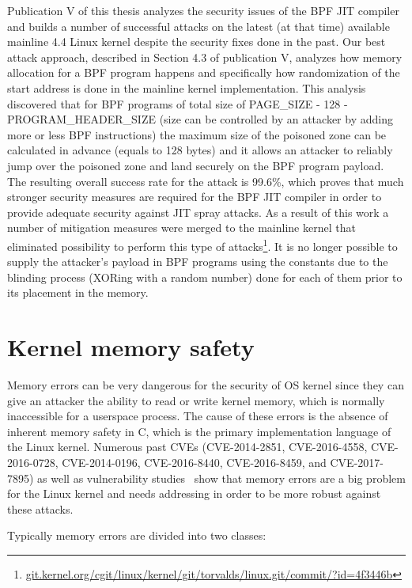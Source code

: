 Publication V of this thesis analyzes the security issues of the BPF JIT compiler and builds a number of successful attacks on the latest (at that time) available mainline 4.4 Linux kernel despite the security fixes done in the past. 
Our best attack approach, described in Section 4.3 of publication V, analyzes how memory allocation for a BPF program happens and specifically how randomization of the start address is done in the mainline kernel implementation. 
This analysis discovered that for BPF programs of total size of PAGE\_SIZE - 128 - PROGRAM\_HEADER\_SIZE (size can be controlled by an attacker by adding more or less BPF instructions) the maximum size of the poisoned zone can be calculated in advance (equals to 128 bytes) and it allows an attacker to reliably jump over the poisoned zone and land securely on the BPF program payload. The resulting overall success rate for the attack is 99.6\%, which proves that much stronger security measures are required for the BPF JIT compiler in order to provide adequate security against JIT spray attacks. As a result of this work a number of mitigation measures were merged to the mainline kernel that eliminated possibility to perform this type of attacks\footnote{\url{git.kernel.org/cgit/linux/kernel/git/torvalds/linux.git/commit/?id=4f3446b}}. It is no longer possible to supply the attacker's payload in BPF programs using the constants due to the blinding process (XORing with a random number) done for each of them prior to its placement in the memory.

\section{Kernel memory safety}
\label{sec:kern-mem-safety}

Memory errors can be very dangerous for the security of OS kernel since they can give an attacker the ability to read or write kernel memory, which is normally inaccessible for a userspace process. The cause of these errors is the absence of inherent memory safety in C, which is the primary implementation language of the Linux kernel. 
Numerous past CVEs (CVE-2014-2851, CVE-2016-4558, CVE-2016-0728, CVE-2014-0196, CVE-2016-8440, CVE-2016-8459, and CVE-2017-7895) as well as vulnerability studies~\cite{raheja2016analysis, chen2011linux} show that memory errors are a big problem for the Linux kernel and needs addressing in order to be more robust against these attacks.

Typically memory errors are divided into two classes:

